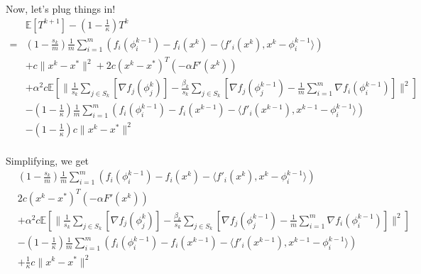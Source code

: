 \documentclass[11pt]{article}
\begin{document}
Now, let's plug things in!
\begin{align*}
&\mathbb{E}\left[ T^{k+1} \right] - \left(1-\frac{1}{\kappa} \right) T^k\\
=& (1-\frac{s_k}{m}) \frac{1}{m}\sum_{i =1}^{m} \left(  f_i(\phi_i^{k-1}) -   f_i(x^{k}) - \langle f'_i(x^{k}), x^{k} -\phi_i^{k-1} \rangle  \right)  \\
  & +c\|x^k - x^* \|^2  + 2 c(x^k - x^* )^T (- \alpha  F'(x^k)) \\
	&+ \alpha^2 c\mathbb{E} \left[  \|\frac{1}{s_k} \sum_{j \in S_k} \left[  \nabla f_j(\phi_j^{k}) \right]- \frac{ \beta_k }{s_k} \sum_{j \in S_k} \left[  \nabla f_j(\phi^{k-1}_j) - \frac{1}{m} \sum_{i = 1}^{m }  \nabla f_i (\phi_i^{k-1}) \right]  \|^2 \right] \\
  & -  \left(1-\frac{1}{\kappa} \right)\frac{1}{m}\sum_{i =1}^{m} \left( f_i(\phi_i^{k-1}) -  f_i(x^{k-1}) - \langle f'_i(x^{k-1}), x^{k-1} -\phi_i^{k-1} \rangle  \right)\\
  & - \left(1-\frac{1}{\kappa} \right)c \|x^{k} - x^* \|^2  \\
\end{align*}

Simplifying, we get
\begin{align*}
& (1-\frac{s_k}{m}) \frac{1}{m}\sum_{i =1}^{m} \left(  f_i(\phi_i^{k-1}) -   f_i(x^{k}) - \langle f'_i(x^{k}), x^{k} -\phi_i^{k-1} \rangle  \right)  \\
  & 2 c(x^k - x^* )^T (- \alpha  F'(x^k)) \\
	&+ \alpha^2 c\mathbb{E} \left[  \|\frac{1}{s_k} \sum_{j \in S_k} \left[  \nabla f_j(\phi_j^{k}) \right]- \frac{ \beta_k }{s_k} \sum_{j \in S_k} \left[  \nabla f_j(\phi^{k-1}_j) - \frac{1}{m} \sum_{i = 1}^{m }  \nabla f_i (\phi_i^{k-1}) \right]  \|^2 \right] \\
  & -  \left(1-\frac{1}{\kappa} \right)\frac{1}{m}\sum_{i =1}^{m} \left( f_i(\phi_i^{k-1}) -  f_i(x^{k-1}) - \langle f'_i(x^{k-1}), x^{k-1} -\phi_i^{k-1} \rangle  \right)\\
  & +\frac{1}{\kappa} c \|x^{k} - x^* \|^2  \\
\end{align*}
\end{document}
